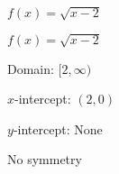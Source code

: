 {$f(x) = \sqrt{x-2}$}
{$f(x) = \sqrt{x-2}$

Domain: $[2, \infty)$ 

$x$-intercept: $(2,0)$

$y$-intercept: None 

No symmetry

\begin{center}
\end{center}
}